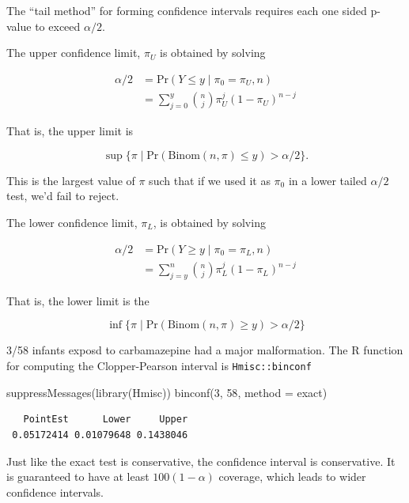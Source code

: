 \documentclass[
  letterpaper,
  DIV=11,
  numbers=noendperiod]{scrreport}
\newenvironment{Shaded}{\begin{snugshade}}{\end{snugshade}}
\newcommand{\AttributeTok}[1]{\textcolor[rgb]{0.40,0.45,0.13}{#1}}
\newcommand{\DecValTok}[1]{\textcolor[rgb]{0.68,0.00,0.00}{#1}}
\newcommand{\FunctionTok}[1]{\textcolor[rgb]{0.28,0.35,0.67}{#1}}
\newcommand{\NormalTok}[1]{\textcolor[rgb]{0.00,0.23,0.31}{#1}}
\newcommand{\StringTok}[1]{\textcolor[rgb]{0.13,0.47,0.30}{#1}}
\begin{document}
The ``tail method'' for forming confidence intervals requires each one
sided p-value to exceed \(\alpha / 2\).

The upper confidence limit, \(\pi_U\) is obtained by solving

\[
\begin{aligned}
\alpha / 2 &= \mathrm{Pr}(Y \le y \mid \pi_0 = \pi_U, n) \\ 
& = \sum_{j=0}^y {n \choose j} \pi_U^j (1-\pi_U)^{n-j}
\end{aligned}
\]

That is, the upper limit is

\[
\sup \{ \pi \mid \mathrm{Pr}(\text{Binom}(n, \pi) \leq y) > \alpha / 2 \}. 
\]

This is the largest value of \(\pi\) such that if we used it as
\(\pi_0\) in a lower tailed \(\alpha/2\) test, we'd fail to reject.

The lower confidence limit, \(\pi_L\), is obtained by solving

\[
\begin{aligned}
\alpha / 2 & = \mathrm{Pr}(Y \ge y \mid \pi_0 = \pi_L, n) \\ 
& = \sum_{j=y}^n {n \choose j} \pi_L^j (1- \pi_L)^{n-j} 
\end{aligned}
\]

That is, the lower limit is the

\[ \inf \{ \pi \mid \mathrm{Pr}(\text{Binom}(n,\pi) \ge y) > \alpha / 2 \}
\]

3/58 infants exposd to carbamazepine had a major malformation. The R
function for computing the Clopper-Pearson interval is
\texttt{Hmisc::binconf}

\begin{Shaded}
\begin{Highlighting}[]
\FunctionTok{suppressMessages}\NormalTok{(}\FunctionTok{library}\NormalTok{(Hmisc))}
\FunctionTok{binconf}\NormalTok{(}\DecValTok{3}\NormalTok{, }\DecValTok{58}\NormalTok{, }\AttributeTok{method =} \StringTok{\textquotesingle{}exact\textquotesingle{}}\NormalTok{)}
\end{Highlighting}
\end{Shaded}

\begin{verbatim}
   PointEst      Lower     Upper
 0.05172414 0.01079648 0.1438046
\end{verbatim}

Just like the exact test is conservative, the confidence interval is
conservative. It is guaranteed to have at least \(100(1-\alpha)\)
coverage, which leads to wider confidence intervals.
\end{document}
